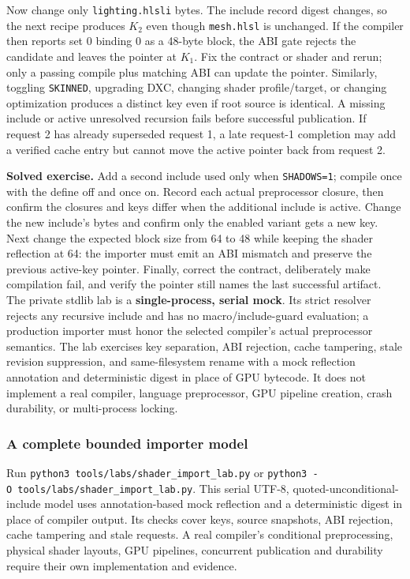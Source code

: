 Now change only \texttt{lighting.hlsli} bytes. The include record digest changes, so the next recipe produces \(K_2\) even though \texttt{mesh.hlsl} is unchanged. If the compiler then reports set 0 binding 0 as a 48-byte block, the ABI gate rejects the candidate and leaves the pointer at \(K_1\). Fix the contract or shader and rerun; only a passing compile plus matching ABI can update the pointer. Similarly, toggling \texttt{SKINNED}, upgrading DXC, changing shader profile/target, or changing optimization produces a distinct key even if root source is identical. A missing include or active unresolved recursion fails before successful publication. If request 2 has already superseded request 1, a late request-1 completion may add a verified cache entry but cannot move the active pointer back from request 2.

\textbf{Solved exercise.} Add a second include used only when \texttt{SHADOWS=1}; compile once with the define off and once on. Record each actual preprocessor closure, then confirm the closures and keys differ when the additional include is active. Change the new include's bytes and confirm only the enabled variant gets a new key. Next change the expected block size from 64 to 48 while keeping the shader reflection at 64: the importer must emit an ABI mismatch and preserve the previous active-key pointer. Finally, correct the contract, deliberately make compilation fail, and verify the pointer still names the last successful artifact. The private stdlib lab is a \textbf{single-process, serial mock}. Its strict resolver rejects any recursive include and has no macro/include-guard evaluation; a production importer must honor the selected compiler's actual preprocessor semantics. The lab exercises key separation, ABI rejection, cache tampering, stale revision suppression, and same-filesystem rename with a mock reflection annotation and deterministic digest in place of GPU bytecode. It does not implement a real compiler, language preprocessor, GPU pipeline creation, crash durability, or multi-process locking.

\subsubsection{A complete bounded importer model}\label{05-engine-i-ch010-a-complete-bounded-importer-model}

\hypertarget{05-engine-i-ch010-a-complete-bounded-importer-model}{}

Run \texttt{python3\ tools/labs/shader\_import\_lab.py} or \texttt{python3\ -O\ tools/labs/shader\_import\_lab.py}. This serial UTF-8, quoted-unconditional-include model uses annotation-based mock reflection and a deterministic digest in place of compiler output. Its checks cover keys, source snapshots, ABI rejection, cache tampering and stale requests. A real compiler's conditional preprocessing, physical shader layouts, GPU pipelines, concurrent publication and durability require their own implementation and evidence.

